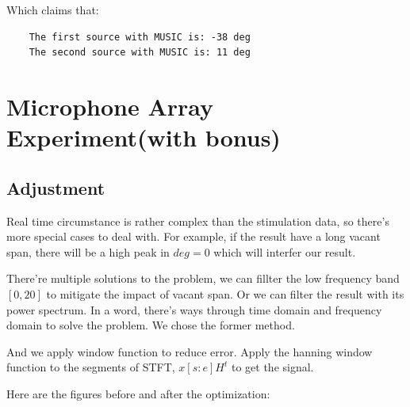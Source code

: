 \documentclass[UTF8]{article}
\begin{document}
Which claims that:
\begin{lstlisting}
    The first source with MUSIC is: -38 deg
    The second source with MUSIC is: 11 deg
\end{lstlisting}

\newpage
\section{Microphone Array Experiment(with bonus)}
\subsection{Adjustment}
\hspace{0.5em} Real time circumstance is rather complex than the stimulation data, so there's more special cases to deal with. For example, if the result have a long vacant span, there will be a high peak in $deg = 0$ which will interfer our result.


There're multiple solutions to the problem, we can fillter the low frequency band $[0, 20]$ to mitigate the impact of vacant span. Or we can filter the result with its power spectrum. In a word, there's ways through time domain and frequency domain to solve the problem. We chose the former method.

And we apply window function to reduce error. Apply the hanning window function to the segments of STFT, $x[s:e]H^t$ to get the signal.

Here are the figures before and after the optimization:
\begin{figure}
    \centering
\end{figure}
\end{document}
